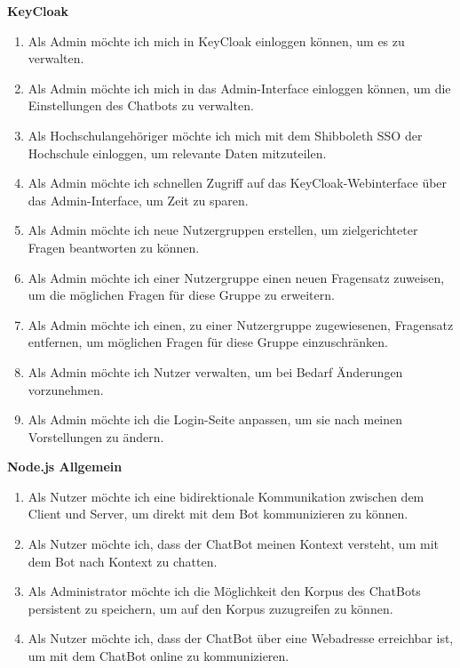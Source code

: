 \textbf{KeyCloak}
\begin{enumerate}
    \item Als Admin möchte ich mich in KeyCloak einloggen können, um es zu verwalten.
    \item Als Admin möchte ich mich in das Admin-Interface einloggen können, um die Einstellungen des Chatbots zu verwalten.
    \item Als Hochschulangehöriger möchte ich mich mit dem Shibboleth SSO der Hochschule einloggen, um relevante Daten mitzuteilen.
    \item Als Admin möchte ich schnellen Zugriff auf das KeyCloak-Webinterface über das Admin-Interface, um Zeit zu sparen.
    \item Als Admin möchte ich neue Nutzergruppen erstellen, um zielgerichteter Fragen beantworten zu können.
    \item Als Admin möchte ich einer Nutzergruppe einen neuen Fragensatz zuweisen, um die möglichen Fragen für diese Gruppe zu erweitern.
    \item Als Admin möchte ich einen, zu einer Nutzergruppe zugewiesenen, Fragensatz entfernen, um möglichen Fragen für diese Gruppe einzuschränken.
    \item Als Admin möchte ich Nutzer verwalten, um bei Bedarf Änderungen vorzunehmen.
    \item Als Admin möchte ich die Login-Seite anpassen, um sie nach meinen Vorstellungen zu ändern.
\end{enumerate}

\textbf{Node.js Allgemein}
\begin{enumerate}
    \item Als Nutzer möchte ich eine bidirektionale Kommunikation zwischen dem Client und Server, um direkt mit dem Bot kommunizieren zu können.
    \item Als Nutzer möchte ich, dass der ChatBot meinen Kontext versteht, um mit dem Bot nach Kontext zu chatten.
    \item Als Administrator möchte ich die Möglichkeit den Korpus des ChatBots persistent zu speichern, um auf den Korpus zuzugreifen zu können.
    \item Als Nutzer möchte ich, dass der ChatBot über eine Webadresse erreichbar ist, um mit dem ChatBot online zu kommunizieren.
\end{enumerate}

